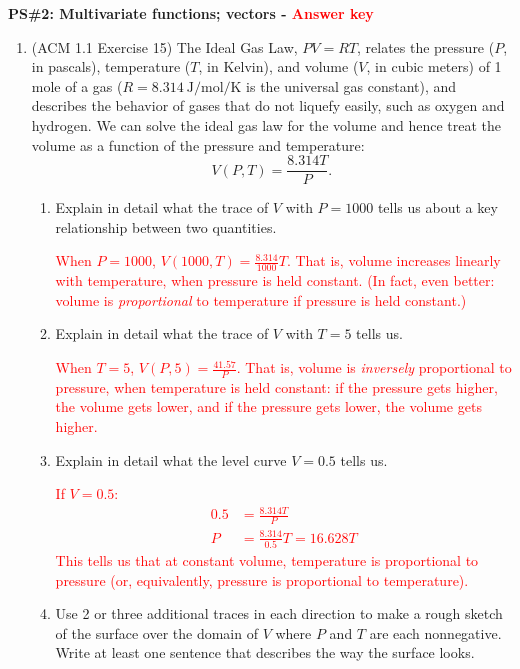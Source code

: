 \documentclass[10pt]{article}
\newcommand{\red}[1]{ %
\textcolor{red}{#1} }%
\renewcommand{\section}[1]{\begin{center} \textbf{#1} \\\end{center}}
\begin{document}
%


\allowdisplaybreaks
\section{PS\#2: Multivariate functions; vectors - \red{Answer key} }

\begin{enumerate}[leftmargin=0pt]
    \item (ACM 1.1 Exercise 15) The Ideal Gas Law, $PV = RT$, relates the pressure ($P$, in pascals), temperature ($T$, in Kelvin), and volume ($V$, in cubic meters) of 1 mole of a gas ($R = \SI[per-mode=fraction]{8.314}{\J\per\mol\per\K}$ is the universal gas constant), and describes the behavior of gases that do not liquefy easily, such as oxygen and hydrogen. We can solve the ideal gas law for the volume and hence treat the volume as a function of the pressure and temperature:
    \[V(P, T) = \frac{8.314T}{P}.\]
    \begin{enumerate}
        \item Explain in detail what the trace of $V$ with $P = 1000$ tells us about a key relationship between two quantities.
        
        \red{When $P = 1000$, $V(1000, T) = \frac{8.314}{1000} T$. That is, volume increases linearly with temperature, when pressure is held constant. (In fact, even better: volume is \textit{proportional} to temperature if pressure is held constant.)}
        \item Explain in detail what the trace of $V$ with $T = 5$ tells us.
        
        \red{When $T = 5$, $V(P, 5) = \frac{41.57}{P}$. That is, volume is \textit{inversely} proportional to pressure, when temperature is held constant: if the pressure gets higher, the volume gets lower, and if the pressure gets lower, the volume gets higher.}
        \item Explain in detail what the level curve $V = 0.5$ tells us.
        
        \red{If $V = 0.5$:
        \begin{align*}
            0.5 &= \frac{8.314 T}{P}\\
            P &= \frac{8.314}{0.5} T = 16.628 T
        \end{align*}
        This tells us that at constant volume, temperature is proportional to pressure (or, equivalently, pressure is proportional to temperature).
        }
        \item Use 2 or three additional traces in each direction to make a rough sketch of the surface over the domain of $V$ where $P$ and $T$ are each nonnegative. Write at least one sentence that describes the way the surface looks.
        

\end{enumerate}
\end{enumerate}
\end{document}
